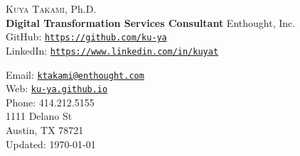 \documentclass[11pt,letterpaper]{article}
\begin{document}
  \thispagestyle{noheader}
  \begin{minipage}{0.7\linewidth}
  {\vspace{1cm}\selectfont \huge {\scshape Kuya Takami}, Ph.D.}\\
\vspace{5mm}
{\bf Digital Transformation Services Consultant} \quad Enthought, Inc.\\
  GitHub: \href{https://github.com/ku-ya}{\tt https://github.com/ku-ya}\\
  LinkedIn:  \href{https://www.linkedin.com/in/kuyat}{\tt https://www.linkedin.com/in/kuyat} \\

  \end{minipage}
  \hspace{2mm}
  \begin{minipage}{0.6\linewidth}
    \vspace{5mm}
  	Email:  \href{mailto:kuya@gwu.edu}{\tt ktakami@enthought.com} \\
  	Web:  \href{https://ku-ya.github.io/}{\tt ku-ya.github.io} \\
    Phone:  414.212.5155\\

    1111 Delano St\\
    Austin, TX 78721\\
    \vspace{5pt}
    Updated: \today
  \end{minipage}

\vspace{5mm}

\end{document}
